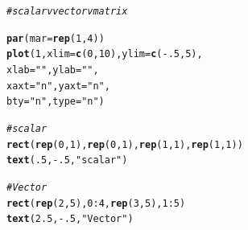 \documentclass{tufte-book}\usepackage[]{graphicx}\usepackage[]{color}
\makeatletter
\newcommand{\hlnum}[1]{\textcolor[rgb]{0.686,0.059,0.569}{#1}}%
\newcommand{\hlstr}[1]{\textcolor[rgb]{0.192,0.494,0.8}{#1}}%
\newcommand{\hlcom}[1]{\textcolor[rgb]{0.678,0.584,0.686}{\textit{#1}}}%
\newcommand{\hlopt}[1]{\textcolor[rgb]{0,0,0}{#1}}%
\newcommand{\hlstd}[1]{\textcolor[rgb]{0.345,0.345,0.345}{#1}}%
\newcommand{\hlkwc}[1]{\textcolor[rgb]{0.333,0.667,0.333}{#1}}%
\newcommand{\hlkwd}[1]{\textcolor[rgb]{0.737,0.353,0.396}{\textbf{#1}}}%
\newenvironment{kframe}{%
 \def\at@end@of@kframe{}%
 \ifinner\ifhmode%
  \def\at@end@of@kframe{\end{minipage}}%
  \begin{minipage}{\columnwidth}%
 \fi\fi%
 \def\FrameCommand##1{\hskip\@totalleftmargin \hskip-\fboxsep
 \colorbox{shadecolor}{##1}\hskip-\fboxsep
     \hskip-\linewidth \hskip-\@totalleftmargin \hskip\columnwidth}%
 \MakeFramed {\advance\hsize-\width
   \@totalleftmargin\z@ \linewidth\hsize
   \@setminipage}}%
 {\par\unskip\endMakeFramed%
 \at@end@of@kframe}
\newenvironment{knitrout}{}{} %
\makeatother
\begin{document}
\begin{marginfigure}
\begin{tiny}
\begin{knitrout}
\color{fgcolor}\begin{kframe}
\begin{alltt}
\hlcom{# scalar v vector v matrix}

\hlkwd{par}\hlstd{(}\hlkwc{mar} \hlstd{=} \hlkwd{rep}\hlstd{(}\hlnum{1}\hlstd{,} \hlnum{4}\hlstd{))}
\hlkwd{plot}\hlstd{(}\hlnum{1}\hlstd{,} \hlkwc{xlim} \hlstd{=} \hlkwd{c}\hlstd{(}\hlnum{0}\hlstd{,} \hlnum{10}\hlstd{),} \hlkwc{ylim} \hlstd{=} \hlkwd{c}\hlstd{(}\hlopt{-}\hlnum{.5}\hlstd{,} \hlnum{5}\hlstd{),}
     \hlkwc{xlab} \hlstd{=} \hlstr{""}\hlstd{,} \hlkwc{ylab} \hlstd{=} \hlstr{""}\hlstd{,}
     \hlkwc{xaxt} \hlstd{=} \hlstr{"n"}\hlstd{,} \hlkwc{yaxt} \hlstd{=} \hlstr{"n"}\hlstd{,}
     \hlkwc{bty} \hlstd{=} \hlstr{"n"}\hlstd{,} \hlkwc{type} \hlstd{=} \hlstr{"n"}\hlstd{)}

\hlcom{# scalar}
\hlkwd{rect}\hlstd{(}\hlkwd{rep}\hlstd{(}\hlnum{0}\hlstd{,} \hlnum{1}\hlstd{),} \hlkwd{rep}\hlstd{(}\hlnum{0}\hlstd{,} \hlnum{1}\hlstd{),} \hlkwd{rep}\hlstd{(}\hlnum{1}\hlstd{,} \hlnum{1}\hlstd{),} \hlkwd{rep}\hlstd{(}\hlnum{1}\hlstd{,} \hlnum{1}\hlstd{))}
\hlkwd{text}\hlstd{(}\hlnum{.5}\hlstd{,} \hlopt{-}\hlnum{.5}\hlstd{,} \hlstr{"scalar"}\hlstd{)}

\hlcom{# Vector}
\hlkwd{rect}\hlstd{(}\hlkwd{rep}\hlstd{(}\hlnum{2}\hlstd{,} \hlnum{5}\hlstd{),} \hlnum{0}\hlopt{:}\hlnum{4}\hlstd{,} \hlkwd{rep}\hlstd{(}\hlnum{3}\hlstd{,} \hlnum{5}\hlstd{),} \hlnum{1}\hlopt{:}\hlnum{5}\hlstd{)}
\hlkwd{text}\hlstd{(}\hlnum{2.5}\hlstd{,} \hlopt{-}\hlnum{.5}\hlstd{,} \hlstr{"Vector"}\hlstd{)}


\end{alltt}
\end{kframe}
\end{knitrout}
\end{tiny}
\end{marginfigure}
\end{document}
